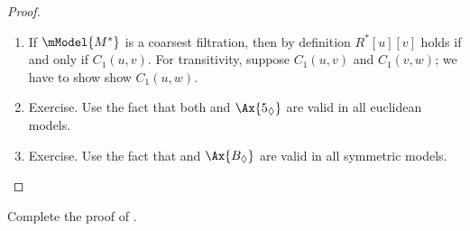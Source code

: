 \documentclass[../../../include/open-logic-section]{subfiles}
\begin{document}
\begin{proof}
\begin{enumerate}
  \item If $\mModel{M^*}$ is a coarsest filtration, then by definition
    $R^*[u][v]$ holds if and only if $C_1(u,v)$. For transitivity,
    suppose $C_1(u,v)$ and $C_1(v,w)$; we have to show show
    $C_1(u,w)$. 
  \item Exercise. Use the fact that both  and $\Ax{5_\Diamond}$
    are valid in all euclidean models.
  \item Exercise. Use the fact that  and $\Ax{B_\Diamond}$ are
    valid in all symmetric models.
\end{enumerate}
\end{proof}

\begin{prob}
  Complete the proof of .
\end{prob}
\end{document}

